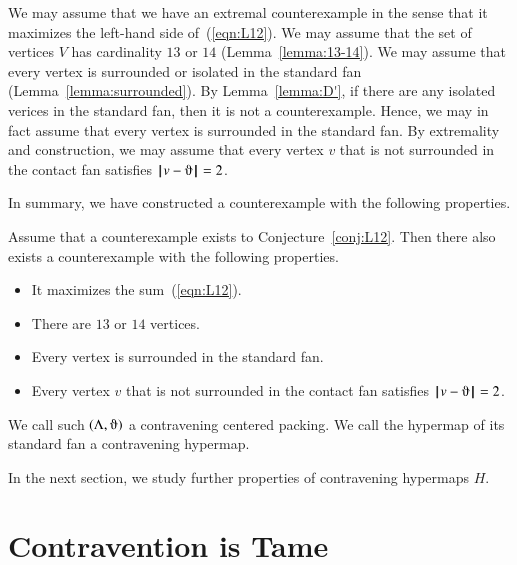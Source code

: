 We may assume that we have an extremal counterexample in the sense that it maximizes the left-hand side of~(\ref{eqn:L12}).  We may assume that the set of vertices $V$ has cardinality $13$ or $14$ (Lemma~\ref{lemma:13-14}). We may assume that every vertex is surrounded or isolated in the standard fan (Lemma~\ref{lemma:surrounded}).  By Lemma~\ref{lemma:D'}, if there are any isolated verices in the standard fan, then it is not a counterexample.  Hence, we may in fact assume that every vertex is surrounded in the standard fan. By extremality and construction, we may assume that every vertex $v$ that is not surrounded in the contact fan satisfies $\norm{v}{\orgn}=2$.



In summary, we have constructed a counterexample with the following properties.

\begin{lemma}\label{lemma:CE} 
Assume that a counterexample exists to Conjecture~\ref{conj:L12}.  Then there also exists a counterexample with the following properties.
\begin{itemize}
\item It maximizes the sum~(\ref{eqn:L12}).
\item There are $13$ or $14$ vertices.
\item Every vertex is surrounded in the standard fan.
\item Every vertex $v$ that is not surrounded in the contact
fan satisfies $\norm{v}{\orgn}=2$.
\end{itemize}
\end{lemma}





\begin{definition}
We call such $(\Lambda,\orgn)$ a contravening centered packing.  We
call the hypermap of its standard fan a contravening hypermap.
\end{definition}


In the next section, we study further properties of contravening hypermaps $H$.



\section{Contravention is Tame}
    \label{sec:contraproof}


